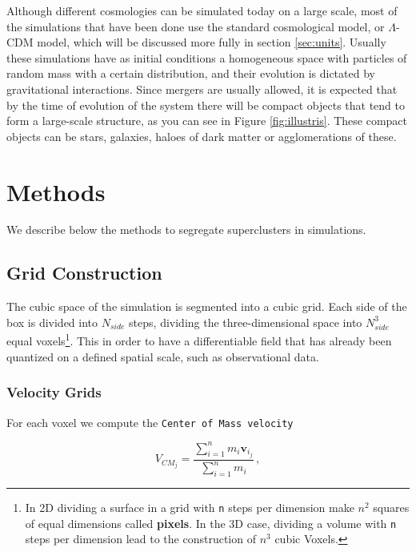 \documentclass[a4paper,fleqn,usenatbib]{mnras}
\begin{document}
Although different cosmologies can be simulated today on a large scale, most of the simulations that have been done use the standard cosmological model, or $\Lambda$-CDM model, which will be discussed more fully in section \ref{sec:units}.
Usually these simulations have as initial conditions a homogeneous space with particles of random mass with a certain distribution, and their evolution is dictated by gravitational interactions. Since mergers are usually allowed, it is expected that by the time of evolution of the system there will be compact objects that tend to form a large-scale structure, as you can see in Figure \ref{fig:illustris}. These compact objects can be stars, galaxies, haloes of dark matter or agglomerations of these.




\section{Methods}

We describe below the methods to segregate superclusters in simulations.

\subsection{Grid Construction}


The cubic space of the simulation is segmented into a cubic grid. Each side of the box is divided into $N_{side}$ steps, dividing the three-dimensional space into $N_{side}^3$ equal voxels\footnote{In 2D dividing a surface in a grid with \texttt{n} steps  per dimension make $n^2$ squares of equal dimensions called \textbf{pixels}. In the 3D case, dividing a volume with \texttt{n} steps per dimension lead to the construction  of $n^3$ cubic Voxels. }. This in order to have a differentiable field that has already been quantized on a defined spatial scale, such as observational data.
 
\subsubsection{Velocity Grids}
\label{sec:INTROVgrid}
For each voxel we compute the \texttt{Center of Mass velocity}  

\begin{equation}
V_{CM_j}=\frac{\sum\limits_{i=1}^n m_i \textbf{v}_{i_j}}{\sum\limits_{i=1}^n m_i} \,,
\label{eq:CMcalc}
\end{equation}
\end{document}
